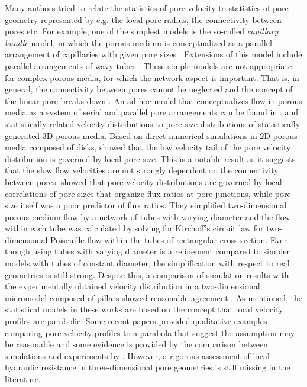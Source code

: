 \documentclass[draft]{agujournal2019}
\begin{document}
Many authors tried to relate the statistics of pore velocity to statistics of pore geometry represented by e.g. the local pore radius, the connectivity between pores etc. For example, one of the simplest models is the so-called \emph{capillary bundle} model, in which the porous medium is conceptualized as a parallel arrangement of capillaries with given pore sizes . Extensions of this model include parallel arrangements of wavy tubes . These simple models are not appropriate for complex porous media, for which the network aspect is important. That is, in general, the connectivity between pores cannot be neglected and the concept of the linear pore breaks down . An ad-hoc model that conceptualizes flow in porous media as a system of serial and parallel pore arrangements can be found in \cite{holzner_intermittent_2015}. \cite{siena_relationship_2014} and \cite{hyman_heterogeneities_2012} statistically related velocity distributions to pore size distributions of statistically generated 3D porous media. Based on direct numerical simulations in 2D porous media composed of disks, \cite{de_anna_prediction_2017} showed that the low velocity tail of the pore velocity distribution is governed by local pore size. This is a notable result as it suggests that the slow flow velocities are not strongly dependent on the connectivity between pores. \cite{alim_local_2017} showed that pore velocity distributions are governed by local correlations of pore sizes that organize flux ratios at pore junctions, while pore size itself was a poor predictor of flux ratios. They simplified two-dimensional porous medium flow by a network of tubes with varying diameter and the flow within each tube was calculated by solving for Kirchoff’s circuit law for two-dimensional Poiseuille flow within the tubes of rectangular cross section. Even though using tubes with varying diameter is a refinement compared to simpler models with tubes of constant diameter, the simplification with respect to real geometries is still strong. Despite this, a comparison of simulation results with the experimentally obtained velocity distribution in a two-dimensional micromodel composed of pillars showed reasonable agreement . As mentioned, the statistical models in these works are based on the concept that local velocity profiles are parabolic. Some recent papers provided qualitative examples comparing pore velocity profiles to a parabola that suggest the assumption may be reasonable  and some evidence is provided by the comparison between simulations and experiments by \cite{alim_local_2017}. However, a rigorous assessment of local hydraulic resistance in three-dimensional pore geometries is still missing in the literature. 
\end{document}
